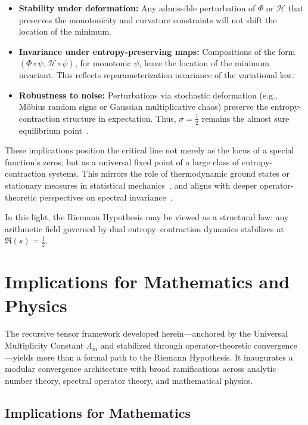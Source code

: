 \documentclass[12pt]{article}
\begin{document}
\begin{itemize}
    \item \textbf{Stability under deformation:} Any admissible perturbation of $\Phi$ or $\mathcal{H}$ that preserves the monotonicity and curvature constraints will not shift the location of the minimum.
    
    \item \textbf{Invariance under entropy-preserving maps:} Compositions of the form $(\Phi \circ \psi, \mathcal{H} \circ \psi)$, for monotonic $\psi$, leave the location of the minimum invariant. This reflects reparameterization invariance of the variational law.

    \item \textbf{Robustness to noise:} Perturbations via stochastic deformation (e.g., Möbius random signs or Gaussian multiplicative chaos) preserve the entropy-contraction structure in expectation. Thus, $\sigma = \tfrac{1}{2}$ remains the almost sure equilibrium point~\cite{billingsley1995probability}.
\end{itemize}

These implications position the critical line not merely as the locus of a special function’s zeros, but as a universal fixed point of a large class of entropy-contraction systems. This mirrors the role of thermodynamic ground states or stationary measures in statistical mechanics~\cite{ellis1985entropy}, and aligns with deeper operator-theoretic perspectives on spectral invariance~\cite{connes1996noncommutative, hejhal1976selberg}.

\medskip

\noindent In this light, the Riemann Hypothesis may be viewed as a structural law: any arithmetic field governed by dual entropy–contraction dynamics stabilizes \emphonly at $\Re(s) = \tfrac{1}{2}$.

\section{Implications for Mathematics and Physics}

The recursive tensor framework developed herein—anchored by the Universal Multiplicity Constant $\Lambda_m$ and stabilized through operator-theoretic convergence—yields more than a formal path to the Riemann Hypothesis. It inaugurates a modular convergence architecture with broad ramifications across analytic number theory, spectral operator theory, and mathematical physics.

\subsection{Implications for Mathematics}
\end{document}
